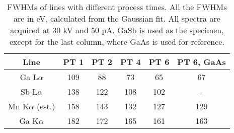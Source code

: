 \begin{table}[phtb]
    \begin{center}
        \caption{
            FWHMs of lines with different process times.
            All the FWHMs are in eV, calculated from the Gaussian fit.
            All spectra are acquired at 30 kV and 50 pA.
            GaSb is used as the specimen, except for the last column, where GaAs is used for reference.
        }
        \renewcommand*{\arraystretch}{1.4}
        \label{tab:results:PTvsFWHMs}
        \begin{tabular}{cccccc}
            \hline
            \textbf{Line}       & \textbf{PT 1} & \textbf{PT 2} & \textbf{PT 4} & \textbf{PT 6} & \textbf{PT 6, GaAs} \\
            \hline
            Ga L$\alpha$        & 109           & 88            & 73            & 65            & 67                  \\
            Sb L$\alpha$        & 138           & 122           & 108           & 102           & -                   \\
            Mn K$\alpha$ (est.) & 158           & 143           & 132           & 127           & 129                 \\
            Ga K$\alpha$        & 182           & 172           & 165           & 161           & 163                 \\
            \hline
        \end{tabular}
    \end{center}
\end{table}
